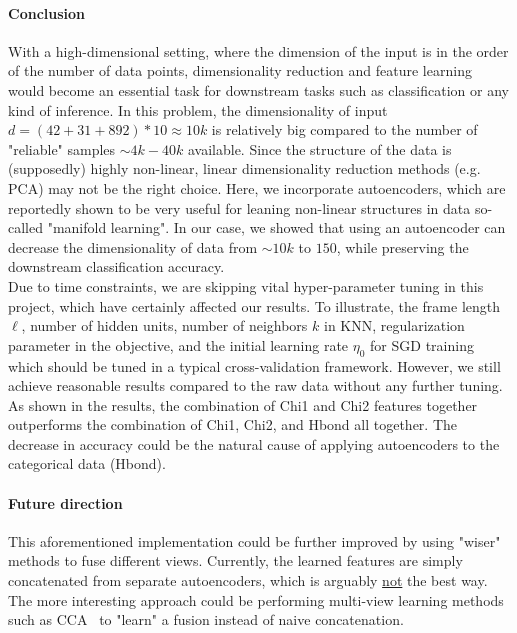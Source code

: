 \documentclass{article}
\begin{document}
\paragraph{Conclusion} With a high-dimensional setting, where the dimension of the input is in the order of the number of data points, dimensionality reduction and feature learning would become an essential task for downstream tasks such as classification or any kind of inference. In this problem, the dimensionality of input $d=(42+31+892)*10 \approx 10k$ is relatively big compared to the number of "reliable" samples $\sim 4k - 40k$ available. Since the structure of the data is (supposedly) highly non-linear, linear dimensionality reduction methods (e.g. PCA) may not be the right choice. Here, we incorporate autoencoders, which are reportedly shown to be very useful for leaning non-linear structures in  data so-called "manifold learning". In our case, we showed that using an autoencoder can decrease the dimensionality of data from $\sim 10k$ to $150$, while preserving the downstream classification accuracy.\\

Due to time constraints, we are skipping vital hyper-parameter tuning in this project, which have certainly affected our results. To illustrate, the frame length $\ell$, number of hidden units, number of neighbors $k$ in KNN, regularization parameter in the objective, and the initial learning rate $\eta_0$ for SGD training which should be tuned in a typical cross-validation framework. However, we still achieve reasonable results compared to the raw data without any further tuning.\\

As shown in the results, the combination of Chi1 and Chi2 features together outperforms the combination of Chi1, Chi2, and Hbond all together. The decrease in accuracy could be the natural cause of applying autoencoders to the categorical data (Hbond).

\paragraph{Future direction} This aforementioned implementation could be further improved by using "wiser" methods to fuse different views. Currently, the learned features are simply concatenated from separate autoencoders, which is arguably \underline{not} the best way. The more interesting approach could be performing multi-view learning methods such as CCA~\cite{hotelling1936relations} to "learn" a fusion instead of naive concatenation.\\
\end{document}
